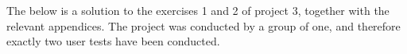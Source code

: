 \documentclass[a4paper]{article}
\begin{document}
\maketitle
\thispagestyle{first} %

\pagebreak

The below is a solution to the exercises 1 and 2 of project 3, together with
the relevant appendices. The project was conducted by a group of one, and
therefore exactly two user tests have been conducted.

\tableofcontents








\end{document}
